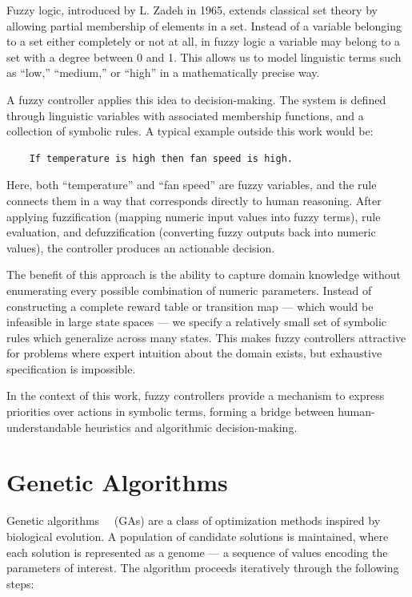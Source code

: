 \documentclass[12pt, a4paper]{report}
\begin{document}
	Fuzzy logic, introduced by L. Zadeh in 1965, extends classical set theory by allowing partial membership of elements in a set.
	Instead of a variable belonging to a set either completely or not at all, in fuzzy logic a variable may belong to a set with a degree between 0 and 1.
	This allows us to model linguistic terms such as “low,” “medium,” or “high” in a mathematically precise way.
	
	A fuzzy controller applies this idea to decision-making.
	The system is defined through linguistic variables with associated membership functions, and a collection of symbolic rules.
	A typical example outside this work would be:
	
\begin{verbatim}
	If temperature is high then fan speed is high.
\end{verbatim}
	
	Here, both “temperature” and “fan speed” are fuzzy variables, and the rule connects them in a way that corresponds directly to human reasoning.
	After applying fuzzification (mapping numeric input values into fuzzy terms), rule evaluation, and defuzzification (converting fuzzy outputs back into numeric values), the controller produces an actionable decision.
	
	The benefit of this approach is the ability to capture domain knowledge without enumerating every possible combination of numeric parameters.
	Instead of constructing a complete reward table or transition map — which would be infeasible in large state spaces — we specify a relatively small set of symbolic rules which generalize across many states.
	This makes fuzzy controllers attractive for problems where expert intuition about the domain exists, but exhaustive specification is impossible.
	
	In the context of this work, fuzzy controllers provide a mechanism to express priorities over actions in symbolic terms, forming a bridge between human-understandable heuristics and algorithmic decision-making.
	
	\section{Genetic Algorithms}
		
		Genetic algorithms~\cite{song2023rl_ea}~\cite{beyer2002evolution_strategies} (GAs) are a class of optimization methods inspired by biological evolution.
		A population of candidate solutions is maintained, where each solution is represented as a genome — a sequence of values encoding the parameters of interest.
		The algorithm proceeds iteratively through the following steps:
		
\end{document}
